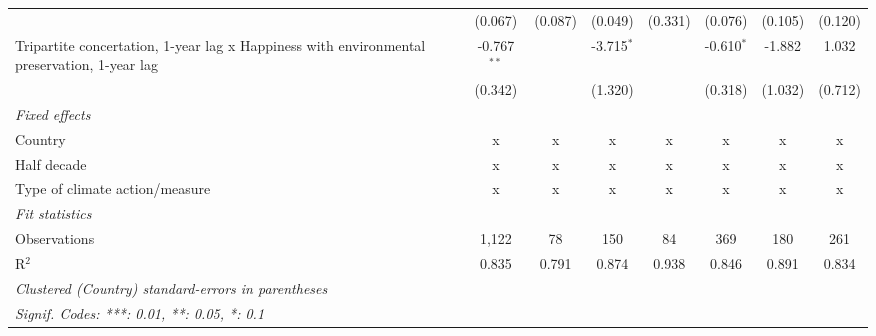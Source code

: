 \begin{table}[htbp]
\begin{tabular}{lccccccc}
                                                                                                  & (0.067)       & (0.087)                   & (0.049)        & (0.331)          & (0.076)         & (0.105)         & (0.120)\\   
      Tripartite concertation, 1-year lag x Happiness with environmental preservation, 1-year lag & -0.767$^{**}$ &                           & -3.715$^{*}$   &                  & -0.610$^{*}$    & -1.882          & 1.032\\   
                                                                                                  & (0.342)       &                           & (1.320)        &                  & (0.318)         & (1.032)         & (0.712)\\   
      \emph{Fixed effects}\\
      Country                                                                                     & x             & x                         & x              & x                & x               & x               & x\\  
      Half decade                                                                                 & x             & x                         & x              & x                & x               & x               & x\\  
      Type of climate action/measure                                                              & x             & x                         & x              & x                & x               & x               & x\\  
      \midrule \emph{Fit statistics}\\
      Observations                                                                                & 1,122         & 78                        & 150            & 84               & 369             & 180             & 261\\  
      R$^2$                                                                                       & 0.835         & 0.791                     & 0.874          & 0.938            & 0.846           & 0.891           & 0.834\\  
      \midrule
      \multicolumn{8}{l}{\emph{Clustered (Country) standard-errors in parentheses}}\\
      \multicolumn{8}{l}{\emph{Signif. Codes: ***: 0.01, **: 0.05, *: 0.1}}\\
   \end{tabular}
\end{table}


